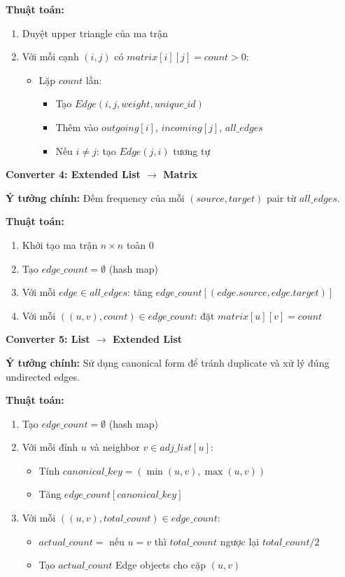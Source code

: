 \documentclass[12pt,a4paper]{article}
\begin{document}
\textbf{Thuật toán:}
\begin{enumerate}
    \item Duyệt upper triangle của ma trận
    \item Với mỗi cạnh $(i,j)$ có $matrix[i][j] = count > 0$:
    \begin{itemize}
        \item Lặp $count$ lần:
        \begin{itemize}
            \item Tạo $Edge(i,j, weight, unique\_id)$
            \item Thêm vào $outgoing[i]$, $incoming[j]$, $all\_edges$
            \item Nếu $i \neq j$: tạo $Edge(j,i)$ tương tự
        \end{itemize}
    \end{itemize}
\end{enumerate}

\vspace{0.5cm}

\textbf{Converter 4: Extended List $\rightarrow$ Matrix}

\textbf{Ý tưởng chính:} Đếm frequency của mỗi $(source, target)$ pair từ $all\_edges$.

\textbf{Thuật toán:}
\begin{enumerate}
    \item Khởi tạo ma trận $n \times n$ toàn $0$
    \item Tạo $edge\_count = \emptyset$ (hash map)
    \item Với mỗi $edge \in all\_edges$: tăng $edge\_count[(edge.source, edge.target)]$
    \item Với mỗi $((u,v), count) \in edge\_count$: đặt $matrix[u][v] = count$
\end{enumerate}

\vspace{0.5cm}

\textbf{Converter 5: List $\rightarrow$ Extended List}

\textbf{Ý tưởng chính:} Sử dụng canonical form để tránh duplicate và xử lý đúng undirected edges.

\textbf{Thuật toán:}
\begin{enumerate}
    \item Tạo $edge\_count = \emptyset$ (hash map)
    \item Với mỗi đỉnh $u$ và neighbor $v \in adj\_list[u]$:
    \begin{itemize}
        \item Tính $canonical\_key = (\min(u,v), \max(u,v))$
        \item Tăng $edge\_count[canonical\_key]$
    \end{itemize}
    \item Với mỗi $((u,v), total\_count) \in edge\_count$:
    \begin{itemize}
        \item $actual\_count = $ nếu $u = v$ thì $total\_count$ ngược lại $total\_count / 2$
        \item Tạo $actual\_count$ Edge objects cho cặp $(u,v)$
    \end{itemize}
\end{enumerate}
\end{document}
